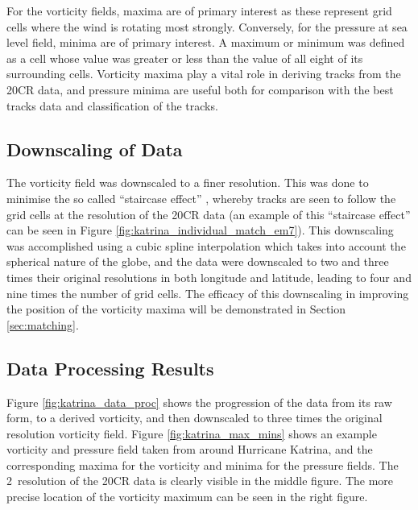 \documentclass[pdftex,12pt,a4paper]{report}
\begin{document}
For the vorticity fields, maxima are of primary interest as these represent grid cells where the
wind is rotating most strongly. Conversely, for the pressure at sea level field, minima are of
primary interest. A maximum or minimum was defined as a cell whose value was greater or less than
the value of all eight of its surrounding cells. Vorticity maxima play a vital role in deriving
tracks from the 20CR data, and pressure minima are useful both for comparison with the best tracks
data and classification of the tracks.

\subsection{Downscaling of Data}

The vorticity field was downscaled to a finer resolution. This was done to minimise the so called
``staircase effect'' \parencite{hodges1994general}, whereby tracks are seen to follow the grid cells
at the resolution of the 20CR data (an example of this ``staircase effect'' can be seen in Figure
\ref{fig:katrina_individual_match_em7}).  This downscaling was accomplished using a cubic spline
interpolation which takes into account the spherical nature of the globe, and the data were
downscaled to two and three times their original resolutions in both longitude and latitude, leading
to four and nine times the number of grid cells. The efficacy of this downscaling in improving the
position of the vorticity maxima will be demonstrated in Section \ref{sec:matching}.


\subsection{Data Processing Results}

Figure \ref{fig:katrina_data_proc} shows the progression of the data from its raw form, to a derived
vorticity, and then downscaled to three times the original resolution vorticity field. Figure
\ref{fig:katrina_max_mins} shows an example vorticity and pressure field taken from around Hurricane
Katrina, and the corresponding maxima for the vorticity and minima for the pressure fields.
The 2\textdegree\ resolution of the 20CR data is clearly visible in the middle figure. The more
precise location of the vorticity maximum can be seen in the right figure.
\end{document}
